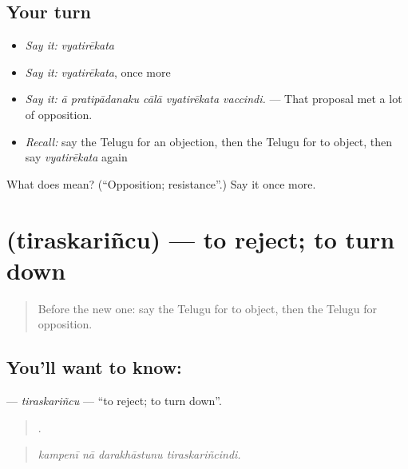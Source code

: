 \subsection*{Your turn}
\begin{itemize}
\raggedright
  \item \emph{Say it:} \emph{vyatirēkata}
  \item \emph{Say it:} \emph{vyatirēkata}, once more
  \item \emph{Say it:} \emph{ā pratipādanaku cālā vyatirēkata vaccindi.} — That proposal met a lot of opposition.
  \item \emph{Recall:} say the Telugu for an objection, then the Telugu for to object, then say \emph{vyatirēkata} again
\end{itemize}

\begin{tcolorbox}[breakable,colback=teal!4,colframe=teal!35!black,title={Before you move on}]
What does  mean? (\textquotedblleft{}Opposition; resistance\textquotedblright{}.) Say it once more.
\end{tcolorbox}
\section[\texorpdfstring{\te{తిరస్కరించు} (tiraskariñcu)}{తిరస్కరించు (tiraskariñcu)}]{ (tiraskariñcu) — to reject; to turn down}

\label{lesson:TE-C386-tiraskarincu}



\begin{quote}
Before the new one: say the Telugu for to object, then the Telugu for opposition.
\end{quote}

\subsection*{You'll want to know: }
\textbf{} — \emph{tiraskariñcu} — \textquotedblleft{}to reject; to turn down\textquotedblright{}.

\begin{quote}
   .
\end{quote}

\begin{quote}
\emph{kampenī nā darakhāstunu tiraskariñcindi.}
\end{quote}

